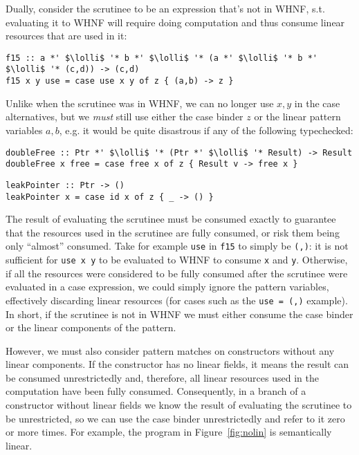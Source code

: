 \documentclass[acmsmall,review]{acmart}
\newcommand{\incode}[1]{\lstinline{#1}}
\newcommand{\lolli}{\multimap}
\begin{document}
Dually, consider the scrutinee to be an expression that's not in WHNF, s.t.
evaluating it to WHNF will require doing computation and thus consume linear
resources that are used in it:
\begin{notyet}
\begin{lstlisting}
f15 :: a *' $\lolli$ '* b *' $\lolli$ '* (a *' $\lolli$ '* b *' $\lolli$ '* (c,d)) -> (c,d)
f15 x y use = case use x y of z { (a,b) -> z }
\end{lstlisting}
\end{notyet}
Unlike when the scrutinee was in WHNF, we can no longer use $x,y$ in the case
alternatives, but we \emph{must} still use either the case binder $z$ or the linear
pattern variables $a,b$, e.g. it would be quite disastrous if any of the following typechecked:
\begin{noway}
\begin{lstlisting}
doubleFree :: Ptr *' $\lolli$ '* (Ptr *' $\lolli$ '* Result) -> Result
doubleFree x free = case free x of z { Result v -> free x }
\end{lstlisting}
\end{noway}
\begin{noway}
\begin{lstlisting}
leakPointer :: Ptr -> ()
leakPointer x = case id x of z { _ -> () }
\end{lstlisting}
\end{noway}
%
%
The result of evaluating the scrutinee must be consumed exactly to guarantee
that the resources used in the scrutinee are fully consumed, or risk them being only ``almost'' consumed. Take for example
\incode{use} in \incode{f15} to simply be \incode{(,)}: it is not sufficient for \incode{use x y} to be
evaluated to WHNF to consume \incode{x} and \incode{y}. Otherwise, if all the resources were
considered to be fully consumed after the scrutinee were evaluated in a case
expression, we could simply ignore the pattern variables, effectively
discarding linear resources (for cases such as the \incode{use = (,)} example). In
short, if the scrutinee is not in WHNF we must either consume the case binder
or the linear components of the pattern.

However, we must also consider pattern matches on constructors without
any linear components. If the constructor has no linear fields, it means the
result can be consumed unrestrictedly and, therefore, all linear resources used
in the computation have been fully consumed.
%
Consequently, in a branch of a constructor without linear fields we know the
result of evaluating the scrutinee to be unrestricted, so we can use the case
binder unrestrictedly and refer to it zero or more times. For example,
the program in Figure~\ref{fig:nolin} is semantically linear.
\end{document}

